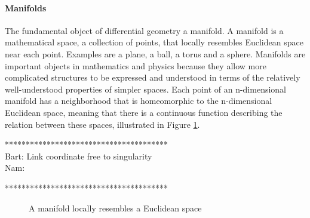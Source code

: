 
\paragraph{Manifolds}
The fundamental object of differential geometry a manifold. A manifold is a mathematical space, a collection of points, that locally resembles Euclidean space near each point. Examples are a plane, a ball, a torus and a sphere. Manifolds are important objects in mathematics and physics because they allow more complicated structures to be expressed and understood in terms of the relatively well-understood properties of simpler spaces. Each point of an n-dimensional manifold has a neighborhood that is homeomorphic to the n-dimensional Euclidean space, meaning that there is a continuous function describing the relation between these spaces, illustrated in Figure \ref{fig:mod.manifold}.

***************************************\\
Bart: Link coordinate free to singularity\\
Nam:

***************************************\\
\begin{figure}[h!]
	\centering
	\caption{A manifold locally resembles a Euclidean space\label{fig:mod.manifold}}
\end{figure}	

